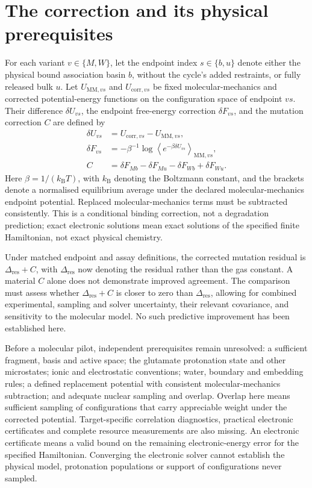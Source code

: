 \documentclass{article}
\begin{document}
\section{The correction and its physical prerequisites}

For each variant \(v\in\{M,W\}\), let the endpoint index \(s\in\{b,u\}\) denote either the physical bound association basin \(b\), without the cycle's added restraints, or fully released bulk \(u\). Let \(U_{\mathrm{MM},vs}\) and \(U_{\mathrm{corr},vs}\) be fixed molecular-mechanics and corrected potential-energy functions on the configuration space of endpoint \(vs\). Their difference \(\delta U_{vs}\), the endpoint free-energy correction \(\delta F_{vs}\), and the mutation correction \(C\) are defined by
\[
\begin{aligned}
\delta U_{vs}&=U_{\mathrm{corr},vs}-U_{\mathrm{MM},vs},\\
\delta F_{vs}&=-\beta^{-1}\log
 \left\langle e^{-\beta\delta U_{vs}}\right\rangle_{\mathrm{MM},vs},\\
C&=\delta F_{Mb}-\delta F_{Mu}-\delta F_{Wb}+\delta F_{Wu}.
\end{aligned}
\]
Here \(\beta=1/(k_{\mathrm B}T)\), with \(k_{\mathrm B}\) denoting the Boltzmann constant, and the brackets denote a normalised equilibrium average under the declared molecular-mechanics endpoint potential. Replaced molecular-mechanics terms must be subtracted consistently. This is a conditional binding correction, not a degradation prediction; exact electronic solutions mean exact solutions of the specified finite Hamiltonian, not exact physical chemistry.

Under matched endpoint and assay definitions, the corrected mutation residual is \(\Delta_{\mathrm{res}}+C\), with \(\Delta_{\mathrm{res}}\) now denoting the residual rather than the gas constant. A material \(C\) alone does not demonstrate improved agreement. The comparison must assess whether \(\Delta_{\mathrm{res}}+C\) is closer to zero than \(\Delta_{\mathrm{res}}\), allowing for combined experimental, sampling and solver uncertainty, their relevant covariance, and sensitivity to the molecular model. No such predictive improvement has been established here.

Before a molecular pilot, independent prerequisites remain unresolved: a sufficient fragment, basis and active space; the glutamate protonation state and other microstates; ionic and electrostatic conventions; water, boundary and embedding rules; a defined replacement potential with consistent molecular-mechanics subtraction; and adequate nuclear sampling and overlap. Overlap here means sufficient sampling of configurations that carry appreciable weight under the corrected potential. Target-specific correlation diagnostics, practical electronic certificates and complete resource measurements are also missing. An electronic certificate means a valid bound on the remaining electronic-energy error for the specified Hamiltonian. Converging the electronic solver cannot establish the physical model, protonation populations or support of configurations never sampled.
\end{document}
